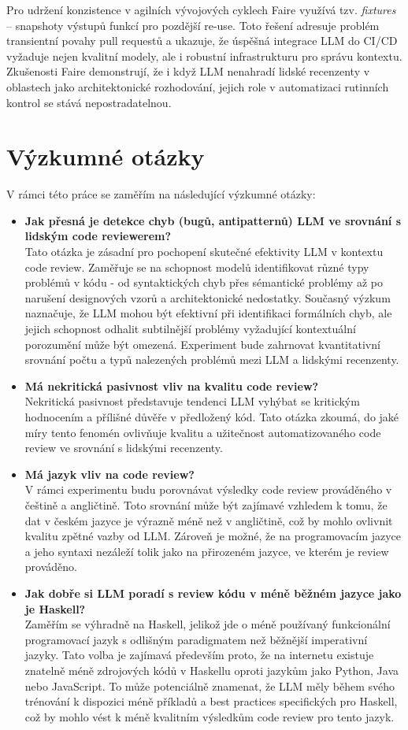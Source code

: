 \documentclass[12pt, a4paper]{article}
\begin{document}
Pro udržení konzistence v agilních vývojových cyklech Faire využívá tzv. \textit{fixtures} – snapshoty výstupů funkcí pro pozdější re-use. Toto řešení adresuje problém transientní povahy pull requestů a ukazuje, že úspěšná integrace LLM do CI/CD vyžaduje nejen kvalitní modely, ale i robustní infrastrukturu pro správu kontextu. Zkušenosti Faire demonstrují, že i když LLM nenahradí lidské recenzenty v oblastech jako architektonické rozhodování, jejich role v automatizaci rutinních kontrol se stává nepostradatelnou.


\section{Výzkumné otázky}
V rámci této práce se zaměřím na následující výzkumné otázky:
\begin{itemize}
  \item \textbf{Jak přesná je detekce chyb (bugů, antipatternů) LLM ve srovnání s lidským code reviewerem?}\\
  Tato otázka je zásadní pro pochopení skutečné efektivity LLM v kontextu code review. Zaměřuje se na schopnost modelů identifikovat různé typy problémů v kódu - od syntaktických chyb přes sémantické problémy až po narušení designových vzorů a architektonické nedostatky. Současný výzkum naznačuje, že LLM mohou být efektivní při identifikaci formálních chyb, ale jejich schopnost odhalit subtilnější problémy vyžadující kontextuální porozumění může být omezená. Experiment bude zahrnovat kvantitativní srovnání počtu a typů nalezených problémů mezi LLM a lidskými recenzenty.
  \item \textbf{Má nekritická pasivnost vliv na kvalitu code review?}\\
  Nekritická pasivnost představuje tendenci LLM vyhýbat se kritickým hodnocením a přílišné důvěře v předložený kód. Tato otázka zkoumá, do jaké míry tento fenomén ovlivňuje kvalitu a užitečnost automatizovaného code review ve srovnání s lidskými recenzenty.
  \item \textbf{Má jazyk vliv na code review?}\\
  V rámci experimentu budu porovnávat výsledky code review prováděného v češtině a angličtině. Toto srovnání může být zajímavé vzhledem k tomu, že dat v českém jazyce je výrazně méně než v angličtině, což by mohlo ovlivnit kvalitu zpětné vazby od LLM. Zároveň je možné, že na programovacím jazyce a jeho syntaxi nezáleží tolik jako na přirozeném jazyce, ve kterém je review prováděno.
  \item \textbf{Jak dobře si LLM poradí s review kódu v méně běžném jazyce jako je Haskell?}\\
  Zaměřím se výhradně na Haskell, jelikož jde o méně používaný funkcionální programovací jazyk s odlišným paradigmatem než běžnější imperativní jazyky. Tato volba je zajímavá především proto, že na internetu existuje znatelně méně zdrojových kódů v Haskellu oproti jazykům jako Python, Java nebo JavaScript. To může potenciálně znamenat, že LLM měly během svého trénování k dispozici méně příkladů a best practices specifických pro Haskell, což by mohlo vést k méně kvalitním výsledkům code review pro tento jazyk.
\end{itemize}
\end{document}
